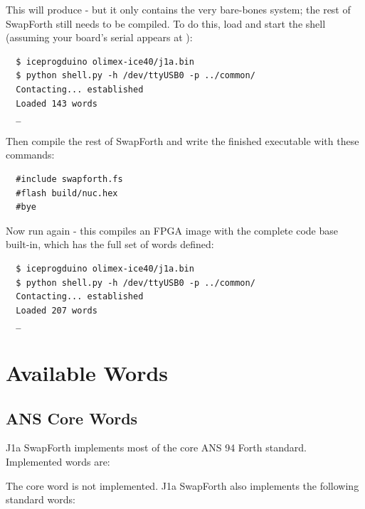 \noindent
This will produce  - but it only contains the very bare-bones system;
the rest of SwapForth still needs to be compiled.
To do this, load  and start the shell
(assuming your board's serial appears at ):

\begin{framed}
\begin{Verbatim}
  $ iceprogduino olimex-ice40/j1a.bin
  $ python shell.py -h /dev/ttyUSB0 -p ../common/
  Contacting... established
  Loaded 143 words
  _
\end{Verbatim}
\end{framed}

Then compile the rest of SwapForth and write the finished executable with these commands:

\begin{framed}
\begin{Verbatim}
  #include swapforth.fs
  #flash build/nuc.hex
  #bye
\end{Verbatim}
\end{framed}

Now run  again - this compiles an FPGA image with the complete code base built-in,
which has the full set of words defined:

\begin{framed}
\begin{Verbatim}
  $ iceprogduino olimex-ice40/j1a.bin
  $ python shell.py -h /dev/ttyUSB0 -p ../common/
  Contacting... established
  Loaded 207 words
  _
\end{Verbatim}
\end{framed}


\chapter{Available Words}

\section{ANS Core Words} 

J1a SwapForth implements most of the core ANS 94 Forth standard.
Implemented words are:



\noindent
The core word
is not implemented.
J1a SwapForth also implements the following standard words:

